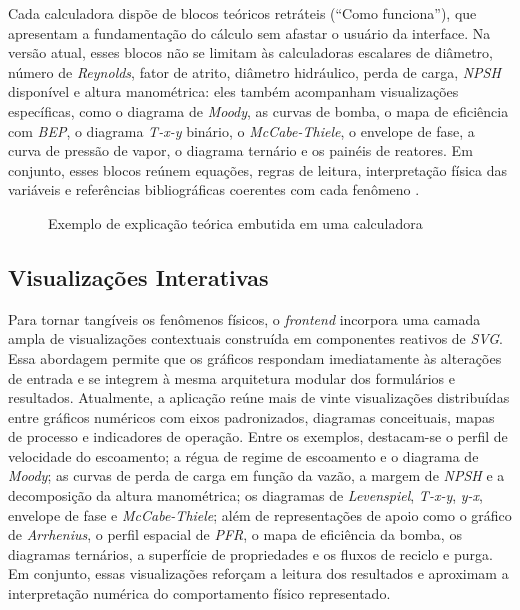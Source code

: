 Cada calculadora dispõe de blocos teóricos retráteis (``Como funciona''), que apresentam a fundamentação do cálculo sem afastar o usuário da interface. Na versão atual, esses blocos não se limitam às calculadoras escalares de diâmetro, número de \textit{Reynolds}, fator de atrito, diâmetro hidráulico, perda de carga, \textit{NPSH} disponível e altura manométrica: eles também acompanham visualizações específicas, como o diagrama de \textit{Moody}, as curvas de bomba, o mapa de eficiência com \textit{BEP}, o diagrama \textit{T-x-y} binário, o \textit{McCabe-Thiele}, o envelope de fase, a curva de pressão de vapor, o diagrama ternário e os painéis de reatores. Em conjunto, esses blocos reúnem equações, regras de leitura, interpretação física das variáveis e referências bibliográficas coerentes com cada fenômeno \cite{white2018,perry2007,fogler2009,smith2018,mccabe2005,poling2001,seader2016,karassik2008,bell2014}.

\begin{figure}[H]
    \centering
    \caption{Exemplo de explicação teórica embutida em uma calculadora}
    \label{fig:explicacao_teorica}
\end{figure}

\subsection{Visualizações Interativas}

Para tornar tangíveis os fenômenos físicos, o \textit{frontend} incorpora uma camada ampla de visualizações contextuais construída em componentes reativos de \textit{SVG}. Essa abordagem permite que os gráficos respondam imediatamente às alterações de entrada e se integrem à mesma arquitetura modular dos formulários e resultados. Atualmente, a aplicação reúne mais de vinte visualizações distribuídas entre gráficos numéricos com eixos padronizados, diagramas conceituais, mapas de processo e indicadores de operação. Entre os exemplos, destacam-se o perfil de velocidade do escoamento; a régua de regime de escoamento e o diagrama de \textit{Moody}; as curvas de perda de carga em função da vazão, a margem de \textit{NPSH} e a decomposição da altura manométrica; os diagramas de \textit{Levenspiel}, \textit{T-x-y}, \textit{y-x}, envelope de fase e \textit{McCabe-Thiele}; além de representações de apoio como o gráfico de \textit{Arrhenius}, o perfil espacial de \textit{PFR}, o mapa de eficiência da bomba, os diagramas ternários, a superfície de propriedades e os fluxos de reciclo e purga. Em conjunto, essas visualizações reforçam a leitura dos resultados e aproximam a interpretação numérica do comportamento físico representado.

